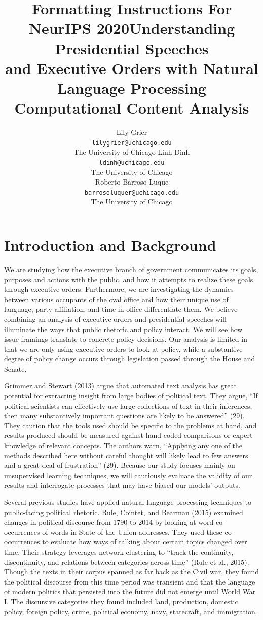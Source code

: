 \documentclass{article}
\title{Formatting Instructions For NeurIPS 2020}
\title{Understanding Presidential Speeches\\ and Executive Orders with Natural Language Processing\\
	\large Computational Content Analysis}
\author{Lily Grier \\
	\texttt{lilygrier@uchicago.edu}  \\
	The University of Chicago
	\AND
	Linh Dinh\\
	\texttt{ldinh@uchicago.edu} \\
    The University of Chicago\\
	\AND
	Roberto Barroso-Luque\\
	\texttt{barrosoluquer@uchicago.edu} \\
	The University of Chicago\\}
\begin{document}
\maketitle

\newpage
\section{Introduction and Background}{
We are studying how the executive branch of government communicates its goals, purposes and actions with the public, and how it attempts to realize these goals through executive orders. Furthermore, we are investigating the dynamics between various occupants of the oval office and how their unique use of language, party affiliation, and time in office differentiate them. We believe combining an analysis of executive orders and presidential speeches will illuminate the ways that public rhetoric and policy interact. We will see how issue framings translate to concrete policy decisions. Our analysis is limited in that we are only using executive orders to look at policy, while a substantive degree of policy change occurs through legislation passed through the House and Senate.

Grimmer and Stewart (2013) argue that automated text analysis has great potential for extracting insight from large bodies of political text. They argue, “If political scientists can effectively use large collections of text in their inferences, then many substantively important questions are likely to be answered” (29). They caution that the tools used should be specific to the problems at hand, and results produced should be measured against hand-coded comparisons or expert knowledge of relevant concepts. The authors warn, “Applying any one of the methods described here without careful thought will likely lead to few answers and a great deal of frustration” (29). Because our study focuses mainly on unsupervised learning techniques, we will cautiously evaluate the validity of our results and interrogate processes that may have biased our models’ outputs. 

Several previous studies have applied natural language processing techniques to public-facing political rhetoric. Rule, Cointet, and Bearman (2015) examined changes in political discourse from 1790 to 2014 by looking at word co-occurrences of words in State of the Union addresses. They used these co-occurrences to evaluate how ways of talking about certain topics changed over time. Their strategy leverages network clustering to “track the continuity, discontinuity, and relations between categories across time” (Rule et al., 2015). Though the texts in their corpus spanned as far back as the Civil war, they found the political discourse from this time period was transient and that the language of modern politics that persisted into the future did not emerge until World War I. The discursive categories they found included land, production, domestic policy, foreign policy, crime, political economy, navy, statecraft, and immigration.

}
\end{document}
